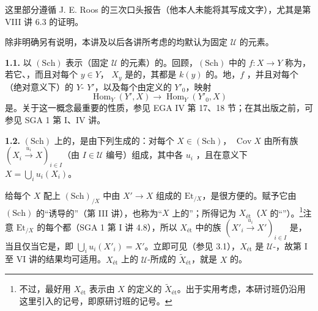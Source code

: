 这里部分遵循 J. E. Roos 的三次口头报告（他本人未能将其写成文字），尤其是第 VIII 讲 6.3 的证明。

除非明确另有说明，本讲及以后各讲所考虑的均默认为固定 $\mathcal U$ 的元素。

\textbf{1.1.} 以 $(\mathrm{Sch})$ 表示（固定 $\mathcal U$ 的元素）的。回顾，$(\mathrm{Sch})$ 中的 $f:X\to Y$ 称为，若它、，而且对每个 $y\in Y$， $X_y$ 是的，其都是 $k(y)$ 的。地，$f$
，并且对每个（绝对意义下）的 $Y$- $Y'$，以及每个由定义的 $Y'_0$，映射
\[
 \operatorname{Hom}_Y(Y',X)\longrightarrow\operatorname{Hom}_Y(Y'_0,X)
\]
是。关于这一概念最重要的性质，参见 EGA IV 第 17、18 节；在其出版之前，可参见 SGA 1 第 I、IV 讲。

\textbf{1.2.} $(\mathrm{Sch})$ 上的，是由下列生成的：对每个 $X\in(\mathrm{Sch})$， $\operatorname{Cov}X$ 由所有族 $(X_i\xrightarrow{u_i}X)_{i\in I}$（由 $I\in\mathcal U$ 编号）组成，其中各 $u_i$ ，且在意义下 $X=\bigcup_i u_i(X_i)$。

给每个 $X$ 配上 $(\mathrm{Sch})_{/X}$ 中由 $X'\to X$ 组成的 $\mathrm{Et}_{/X}$，是很方便的。赋予它由 $(\mathrm{Sch})$ 的“诱导的”（第 III 讲），也称为“$X$ 上的”；所得记为 $X_{\text{ét}}$（$X$ 的“”）。\footnote{不过，最好用 $X_{\text{ét}}$ 表示由 $X$ 的定义的 $\widetilde X_{\text{ét}}$。出于实用考虑，本研讨班仍沿用这里引入的记号，即原研讨班的记号。}注意 $\mathrm{Et}_{/X}$ 的每个都（SGA 1 第 I 讲 4.8），所以 $X_{\text{ét}}$ 中的族 $(X'_i\xrightarrow{u_i}X')_{i\in I}$ 是，当且仅当它是，即 $\bigcup_i u_i(X'_i)=X'$。立即可见（参见 3.1），$X_{\text{ét}}$ 是 $\mathcal U$-，故第 I 至 VI 讲的结果均可适用。$X_{\text{ét}}$ 上的 $\mathcal U$-所成的 $\widetilde X_{\text{ét}}$，就是 $X$ 的。

